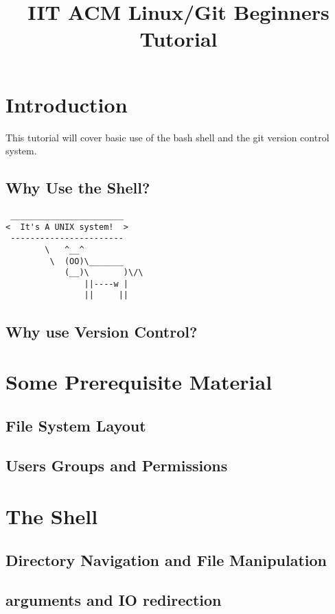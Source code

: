 \documentclass[10pt]{article}
\title{IIT ACM Linux/Git Beginners Tutorial}
\begin{document}
\maketitle

\section{Introduction}
This tutorial will cover basic use of the bash shell and the git version control system.

  \subsection{Why Use the Shell?}

  \begin{lstlisting}
 _______________________ 
<  It's A UNIX system!  >
 ----------------------- 
        \   ^__^
         \  (OO)\_______
            (__)\       )\/\
                ||----w |
                ||     ||
  \end{lstlisting}


  \subsection{Why use Version Control?}

\section{Some Prerequisite Material}
  \subsection{File System Layout}
  \subsection{Users Groups and Permissions}
  
\section{The Shell}
  \subsection{Directory Navigation and File Manipulation}
  \subsection{arguments and IO redirection}
\end{document}
